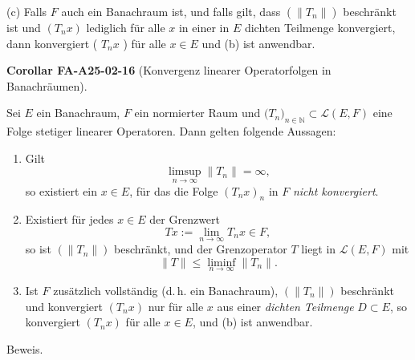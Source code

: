 \documentclass[10pt, letterpaper]{article}
\newcommand{\CustomHeading}[3]{%
  \par\medskip\noindent%
  \textbf{#1 #2} \textnormal{(#3)}.\enskip%
}
\newenvironment{KORO}[2]{\begin{unitbox}\CustomHeading{Corollar}{#1}{#2}}{\end{unitbox}}
\begin{document}
(c) Falls $F$ auch ein Banachraum ist, und falls gilt, dass $\left(\left\|T_{n}\right\|\right)$ beschränkt ist und $\left(T_{n} x\right)$ lediglich für alle $x$ in einer in $E$ dichten Teilmenge konvergiert, dann konvergiert ( $T_{n} x$ ) für alle $x \in E$ und (b) ist anwendbar.



\begin{KORO}{FA-A25-02-16}{Konvergenz linearer Operatorfolgen in Banachräumen}
Sei $E$ ein Banachraum, $F$ ein normierter Raum und $\bigl(T_n\bigr)_{n\in\mathbb{N}}\subset\mathcal{L}(E,F)$ eine Folge stetiger linearer Operatoren. Dann gelten folgende Aussagen:

\begin{enumerate}[label=(\alph*)]
\item
Gilt
\[
\limsup_{n\to\infty}\|T_n\|=\infty,
\]
so existiert ein $x\in E$, für das die Folge $(T_nx)_{n}$ in $F$ \emph{nicht konvergiert}.

\item
Existiert für jedes $x\in E$ der Grenzwert
\[
Tx:=\lim_{n\to\infty}T_nx\in F,
\]
so ist $(\|T_n\|)$ beschränkt, und der Grenzoperator $T$ liegt in $\mathcal{L}(E,F)$ mit
\[
\|T\|\le \liminf_{n\to\infty}\|T_n\|.
\]

\item
Ist $F$ zusätzlich vollständig (d.\,h. ein Banachraum), $(\|T_n\|)$ beschränkt und konvergiert $(T_nx)$ nur für alle $x$ aus einer \emph{dichten Teilmenge} $D\subset E$, so konvergiert $(T_nx)$ für alle $x\in E$, und (b) ist anwendbar.
\end{enumerate}
\end{KORO}




Beweis. 
\end{document}
